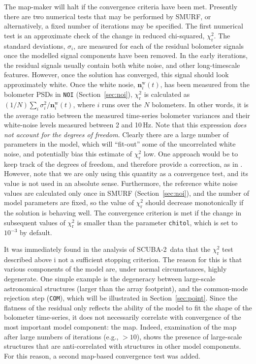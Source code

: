 \documentclass[useAMS,usenatbib,nofootinbib]{mn2e}
\newcommand{\scuba}{SCUBA-2}
\newcommand{\model}[1]{\texttt{#1}}
\begin{document}
The map-maker will halt if the convergence criteria have been
met. Presently there are two numerical tests that may be performed by
SMURF, or alternatively, a fixed number of iterations may be
specified. The first numerical test is an approximate check of the
change in reduced chi-squared, $\chi^2_\mathrm{r}$. The standard
deviations, $\sigma_i$, are measured for each of the residual
bolometer signals once the modelled signal components have been
removed. In the early iterations, the residual signals usually contain
both white noise, and other long-timescale features. However, once the
solution has converged, this signal should look approximately
white. Once the white nosie, $\mathbf{n}^\mathrm{w}_i(t)$, has been
measured from the bolometer PSDs in \model{NOI}
(Section~\ref{sec:noi}), $\chi^2_\mathrm{r}$ is calculated as $(1/N)
\sum_i \sigma^2_i / \mathbf{n}^\mathrm{w}_i(t)$, where $i$ runs over
the $N$ bolometers. In other words, it is the average ratio between
the measured time-series bolometer variances and their white-noise
levels measured between 2 and 10\,Hz. Note that this expression
\emph{does not account for the degrees of freedom}. Clearly there are
a large number of parameters in the model, which will ``fit-out'' some
of the uncorrelated white noise, and potentially bias this estimate of
$\chi^2_\mathrm{r}$ low. One approach would be to keep track of the
degrees of freedom, and therefore provide a correction, as in
\citet{kovacs2008}. However, note that we are only using this quantity
as a convergence test, and its value is not used in an absolute
sense. Furthermore, the reference white noise values are calculated
only once in SMURF (Section~\ref{sec:noi}), and the number of model
parameters are fixed, so the value of $\chi^2_\mathrm{r}$ should
decrease monotonically if the solution is behaving well. The
convergence criterion is met if the change in subsequent values of
$\chi^2_\mathrm{r}$ is smaller than the parameter \texttt{chitol},
which is set to $10^{-3}$ by default.

It was immediately found in the analysis of \scuba\ data that the
$\chi^2_\mathrm{r}$ test described above i not a sufficient stopping
criterion. The reason for this is that various components of the model
are, under normal circumstances, highly degenerate. One simple example
is the degeneracy between large-scale astronomical structures (larger
than the array footprint), and the common-mode rejection step
(\model{COM}), which will be illustrated in
Section~\ref{sec:point}. Since the flatness of the residual only
reflects the ability of the model to fit the shape of the bolometer
time-series, it does not necessarily correlate with convergence of the
most important model component: the map. Indeed, examination of the
map after large numbers of iterations (e.g., $>10$), shows the
presence of large-scale structures that are anti-correlated with
structures in other model components. For this reason, a second
map-based convergence test was added.
\end{document}
